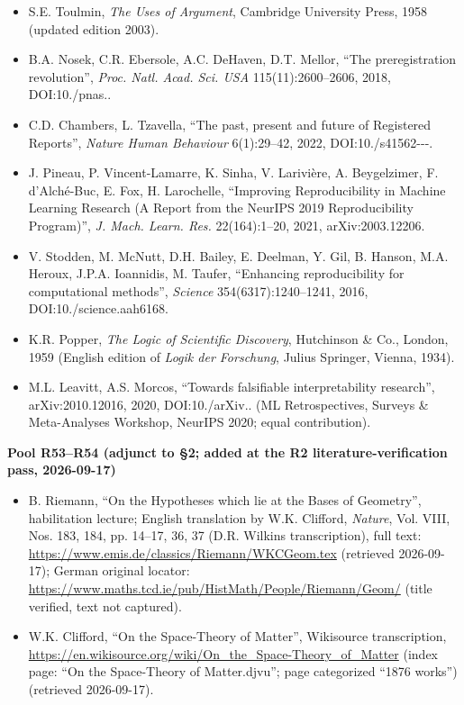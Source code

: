\documentclass[11pt,a4paper]{article}
\begin{document}
\begin{itemize}[leftmargin=1.6em,itemsep=2pt,parsep=0pt,topsep=3pt]
\item[R46.] S.E. Toulmin, \textit{The Uses of Argument}, Cambridge University Press, 1958 (updated edition 2003).
\item[R47.] B.A. Nosek, C.R. Ebersole, A.C. DeHaven, D.T. Mellor, ``The preregistration revolution'', \textit{Proc. Natl. Acad. Sci. USA} 115(11):2600–2606, 2018, DOI:10./\allowbreak pnas..\allowbreak 
\item[R48.] C.D. Chambers, L. Tzavella, ``The past, present and future of Registered Reports'', \textit{Nature Human Behaviour} 6(1):29–42, 2022, DOI:10./\allowbreak s41562---.\allowbreak 
\item[R49.] J. Pineau, P. Vincent-Lamarre, K. Sinha, V. Larivière, A. Beygelzimer, F. d'Alché-Buc, E. Fox, H. Larochelle, ``Improving Reproducibility in Machine Learning Research (A Report from the NeurIPS 2019 Reproducibility Program)'', \textit{J. Mach. Learn. Res.} 22(164):1–20, 2021, arXiv:2003.12206.
\item[R50.] V. Stodden, M. McNutt, D.H. Bailey, E. Deelman, Y. Gil, B. Hanson, M.A. Heroux, J.P.A. Ioannidis, M. Taufer, ``Enhancing reproducibility for computational methods'', \textit{Science} 354(6317):1240–1241, 2016, DOI:10./\allowbreak science.\allowbreak aah6168.\allowbreak 
\item[R51.] K.R. Popper, \textit{The Logic of Scientific Discovery}, Hutchinson \& Co., London, 1959 (English edition of \textit{Logik der Forschung}, Julius Springer, Vienna, 1934).
\item[R52.] M.L. Leavitt, A.S. Morcos, ``Towards falsifiable interpretability research'', arXiv:2010.12016, 2020, DOI:10./\allowbreak arXiv.. (ML Retrospectives, Surveys \& Meta-Analyses Workshop, NeurIPS 2020; equal contribution).
\end{itemize}

\medskip
\noindent\textbf{Pool R53–R54 (adjunct to §2; added at the R2 literature-verification pass, 2026-09-17)}\par\addvspace{2pt}

\begin{itemize}[leftmargin=1.6em,itemsep=2pt,parsep=0pt,topsep=3pt]
\item[R53.] B. Riemann, ``On the Hypotheses which lie at the Bases of Geometry'', habilitation lecture; English translation by W.K. Clifford, \textit{Nature}, Vol. VIII, Nos. 183, 184, pp. 14–17, 36, 37 (D.R. Wilkins transcription), full text: \url{https://www.emis.de/classics/Riemann/WKCGeom.tex} (retrieved 2026-09-17); German original locator: \url{https://www.maths.tcd.ie/pub/HistMath/People/Riemann/Geom/} (title verified, text not captured).
\item[R54.] W.K. Clifford, ``On the Space-Theory of Matter'', Wikisource transcription, \url{https://en.wikisource.org/wiki/On_the_Space-Theory_of_Matter} (index page: ``On the Space-Theory of Matter.djvu''; page categorized ``1876 works'') (retrieved 2026-09-17).
\end{itemize}
\end{document}
